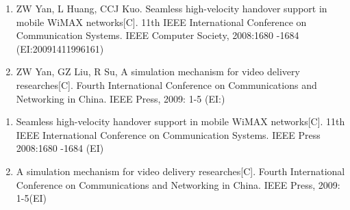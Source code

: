 \documentclass[
    doctor,
    truefont,
    pdflinks,
    ]{xjtuthesis}
\def\authornames{\BlindPeerReviewOFF}
\def\swithON{\BlindPeerReviewOFF}
\def\authornames{\BlindPeerReview}
\def\swithON{\BlindPeerReviewON}
\begin{document}


\xjtuchead
\xjtuehead
\xjtucinfopage
\xjtueinfopage
\xjtutoc
\xjtutoe
\clearpage



\xjtucontent




%

%

%

%


\xjtuendcontent


\xjtuappendix


\xjtuendappendix


\ifx\authornames\swithON
    
\else
\fi

    


\ifx\authornames\swithON
      \begin{enumerate}
        \item ZW Yan, L Huang, CCJ Kuo.   Seamless high-velocity handover support in mobile
WiMAX networks[C].  11th IEEE  International Conference on Communication Systems.  IEEE Computer Society, 2008:1680 -1684 (EI:20091411996161)
	\item ZW Yan, GZ Liu, R Su,  A simulation
mechanism for video delivery researches[C]. Fourth International Conference on Communications and Networking in China. IEEE Press, 2009: 1-5 (EI:)
    \end{enumerate}
\else
    \begin{enumerate}
        \item Seamless high-velocity handover support in mobile
WiMAX networks[C].  11th IEEE  International Conference on Communication Systems.  IEEE Press 2008:1680 -1684 (EI)
	\item A simulation
mechanism for video delivery researches[C]. Fourth International Conference on Communications and Networking in China. IEEE Press, 2009: 1-5(EI)
    \end{enumerate}
\fi



\xjtuacademicintegrity
\end{document}
